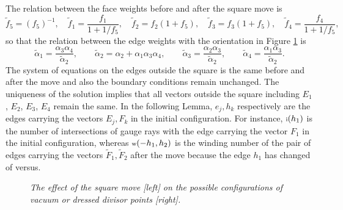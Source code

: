 \documentclass[11pt]{amsart}
\theoremstyle{plain}
\numberwithin{equation}{section}
\def \i {\mbox{\scriptsize{i}}}
\def \w {\mbox{\scriptsize{w}}}
\begin{document}
The relation between the face weights before and after the square move is \cite{Pos}
\[
{\tilde f}_5 = (f_5)^{-1}, \quad {\tilde f}_1 = \frac{f_1}{1+1/f_5}, \quad {\tilde f}_2 = f_2 (1+f_5), \quad {\tilde f}_3 = f_3 (1+f_5),\quad {\tilde f}_4 = \frac{f_4}{1+1/f_5},
\]
so that the relation between the edge weights with the orientation in Figure \ref{fig:squaremove} is
\begin{equation}\label{eq:alpha}
{\tilde \alpha}_1 = \frac{\alpha_3\alpha_4}{{\tilde\alpha}_2}, 
\quad\quad {\tilde \alpha}_2 = \alpha_2 + \alpha_1\alpha_3\alpha_4, \quad\quad  {\tilde \alpha}_3 = \frac{\alpha_2\alpha_3}{{\tilde \alpha}_2}, \quad\quad \displaystyle {\tilde \alpha}_4 = \frac{\alpha_1\alpha_3}{{\tilde \alpha}_2}.
\end{equation}
The system of equations on the edges outside the square is the same before and after the move and also the boundary
conditions remain unchanged. The uniqueness of the solution implies that all vectors outside the square 
including $E_1$, $E_2$, $E_3$, $E_4$ remain the same. In the following Lemma, $e_j, h_k$ respectively are the edges carrying the vectors $E_j,F_k$ in the initial configuration. For instance, $\i(h_1)$ is the number of intersections of gauge rays with the edge carrying the vector $F_1$ in the initial configuration, whereas $\w(-h_1,h_2)$ is the winding number of the pair of edges carrying the vectors $\tilde F_1, \tilde F_2$ after the move because the edge $h_1$ has changed of versus.

\begin{figure}%
  \caption{\small{\sl The effect of the square move [left] on the possible configurations of vacuum or dressed divisor points [right].}\label{fig:squaremove}}
\end{figure}
\end{document}
